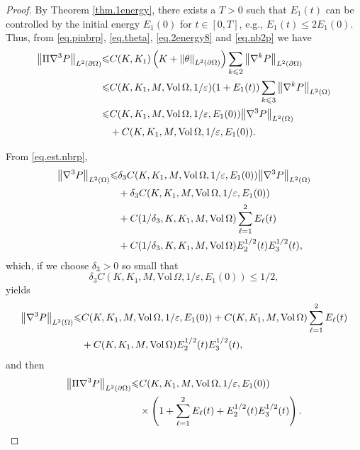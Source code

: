 \documentclass[12pt,reqno]{amsart}
\numberwithin{equation}{section}
\theoremstyle{definition}
\theoremstyle{remark}
\begin{document}
\begin{proof}
By Theorem \ref{thm.1energy}, there exists a $T>0$ such that $E_1(t)$ can be controlled by the initial energy $E_1(0)$ for $t\in[0,T]$, e.g., $E_1(t){\leqslant} 2E_1(0)$.
Thus, from \eqref{eq.pinbrp}, \eqref{eq.theta}, \eqref{eq.2energy8} and \eqref{eq.nb2p} we have
\begin{align}
  {\left\Vert{\Pi{\nabla}^3{P }}\right\Vert}_{L^2({\partial}\Omega)}{\leqslant} &C(K,K_1)\left(K+{\left\Vert{\theta}\right\Vert}_{L^2({\partial}\Omega)}\right) \sum_{k{\leqslant} 2}{\left\Vert{{\nabla}^k{P }}\right\Vert}_{L^2({\partial}\Omega)}{\nonumber}\\
  {\leqslant}&C(K,K_1,M,{\mathrm{Vol}\,}\Omega,1/{\varepsilon})(1+E_1(t))\sum_{k{\leqslant} 3}{\left\Vert{{\nabla}^k{P }}\right\Vert}_{L^2(\Omega)}{\nonumber}\\
  {\leqslant}& C(K,K_1,M,{\mathrm{Vol}\,}\Omega,1/{\varepsilon},E_1(0)){\left\Vert{{\nabla}^3{P }}\right\Vert}_{L^2(\Omega)} {\nonumber}\\ &+C(K,K_1,M,{\mathrm{Vol}\,}\Omega,1/{\varepsilon},E_1(0)).
\end{align}

From \eqref{eq.est.nbrp},
\begin{align}
  {\left\Vert{{\nabla}^3 {P }}\right\Vert}_{L^2(\Omega)}
  {\leqslant}& \delta_3 C(K,K_1,M,{\mathrm{Vol}\,}\Omega,1/{\varepsilon},E_1(0)){\left\Vert{{\nabla}^3{P }}\right\Vert}_{L^2(\Omega)} {\nonumber}\\
  &+\delta_3 C(K,K_1,M,{\mathrm{Vol}\,}\Omega,1/{\varepsilon},E_1(0)){\nonumber}\\
  &+C(1/\delta_3,K,K_1,M,{\mathrm{Vol}\,}\Omega)\sum_{\ell=1}^2 E_\ell(t){\nonumber}\\
  &+C(1/\delta_3,K,K_1,M,{\mathrm{Vol}\,}\Omega)E_2^{1/2}(t)E_3^{1/2}(t),
\end{align}
which, if we choose $\delta_3>0$ so small that $$\delta_3 C(K,K_1,M,{\mathrm{Vol}\,}\Omega,1/{\varepsilon},E_1(0)){\leqslant} 1/2,$$
yields
\begin{align}\label{eq.nb3p}
  {\left\Vert{{\nabla}^3 {P }}\right\Vert}_{L^2(\Omega)}
  {\leqslant}&  C(K,K_1,M,{\mathrm{Vol}\,}\Omega,1/{\varepsilon},E_1(0))+C(K,K_1,M,{\mathrm{Vol}\,}\Omega)\sum_{\ell=1}^2 E_\ell(t){\nonumber}\\
  &+C(K,K_1,M,{\mathrm{Vol}\,}\Omega)E_2^{1/2}(t)E_3^{1/2}(t),
\end{align}
and then
\begin{align}
  {\left\Vert{\Pi{\nabla}^3 {P }}\right\Vert}_{L^2({\partial}\Omega)}
  {\leqslant}&  C(K,K_1,M,{\mathrm{Vol}\,}\Omega,1/{\varepsilon},E_1(0)){\nonumber}\\
  &\times\left(1+\sum_{\ell=1}^2 E_\ell(t)+E_2^{1/2}(t)E_3^{1/2}(t)\right).
\end{align}


\end{proof}
\end{document}
